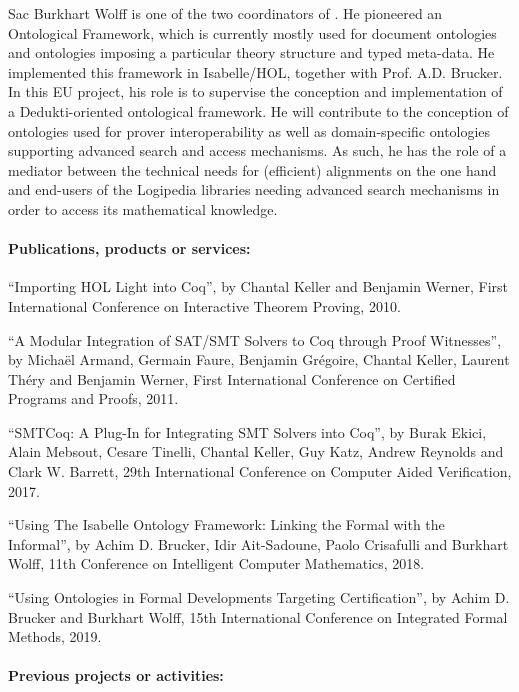 \begin{sitedescription}{Sac}
Burkhart Wolff is one of the two coordinators of . He
pioneered an Ontological Framework, which is currently mostly used for
document ontologies and ontologies imposing a particular theory
structure and typed meta-data. He implemented this framework in
Isabelle/HOL, together with Prof. A.D. Brucker. In this EU project, his
role is to supervise the conception and implementation of a
Dedukti-oriented ontological framework. He will contribute to the
conception of ontologies used for prover interoperability as well as
domain-specific ontologies supporting advanced search and access
mechanisms. As such, he has the role of a mediator between the technical
needs for (efficient) alignments on the one hand and end-users of the
Logipedia libraries needing advanced search mechanisms in order to
access its mathematical knowledge.

\paragraph*{Publications, products or services:}

\begin{compactitem}
\item ``Importing HOL Light into Coq'', by Chantal Keller and Benjamin
  Werner, First International Conference on Interactive Theorem Proving,
  2010.
\item ``A Modular Integration of SAT/SMT Solvers to Coq through Proof
  Witnesses'', by Michaël Armand, Germain Faure, Benjamin Grégoire,
  Chantal Keller, Laurent Théry and Benjamin Werner, First International
  Conference on Certified Programs and Proofs, 2011.
\item ``SMTCoq: A Plug-In for Integrating SMT Solvers into Coq'', by
  Burak Ekici, Alain Mebsout, Cesare Tinelli, Chantal Keller, Guy Katz,
  Andrew Reynolds and Clark W. Barrett, 29th International Conference on
  Computer Aided Verification, 2017.
\item ``Using The Isabelle Ontology Framework: Linking the Formal with
  the Informal'', by Achim D. Brucker, Idir Ait-Sadoune, Paolo
  Crisafulli and Burkhart Wolff, 11th Conference on Intelligent Computer
  Mathematics, 2018.
\item ``Using Ontologies in Formal Developments Targeting
  Certification'', by Achim D. Brucker and Burkhart Wolff, 15th
  International Conference on Integrated Formal Methods, 2019.
\end{compactitem}

\paragraph*{Previous projects or activities:}


\end{sitedescription}

